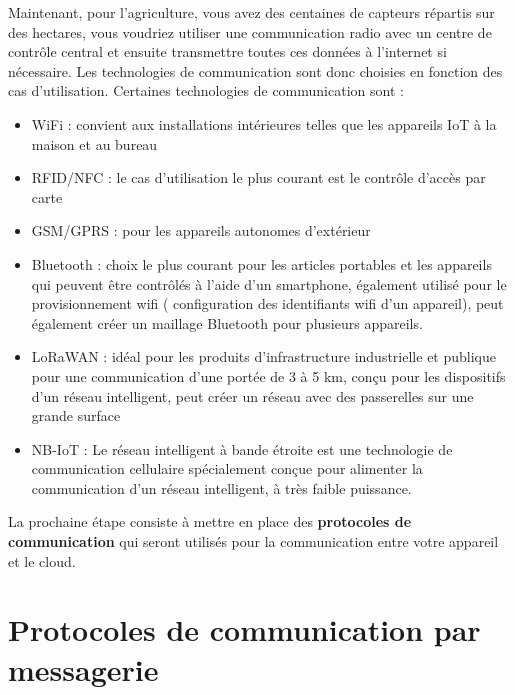 \documentclass[12pt]{report}
\begin{document}
Maintenant, pour l'agriculture, vous avez des centaines de capteurs
répartis sur des hectares, vous voudriez utiliser une communication
radio avec un centre de contrôle central et ensuite transmettre toutes
ces données à l'internet si nécessaire. Les technologies de
communication sont donc choisies en fonction des cas d'utilisation.
Certaines technologies de communication sont :

\begin{itemize}
      \item
            WiFi : convient aux installations intérieures telles que les appareils
            IoT à la maison et au bureau
      \item
            RFID/NFC : le cas d'utilisation le plus courant est le contrôle
            d'accès par carte
      \item
            GSM/GPRS : pour les appareils autonomes d'extérieur
      \item
            Bluetooth : choix le plus courant pour les articles portables et les
            appareils qui peuvent être contrôlés à l'aide d'un smartphone,
            également utilisé pour le provisionnement wifi ( configuration des
            identifiants wifi d'un appareil), peut également créer un maillage
            Bluetooth pour plusieurs appareils.
      \item
            LoRaWAN : idéal pour les produits d'infrastructure industrielle et
            publique pour une communication d'une portée de 3 à 5 km, conçu pour
            les dispositifs d'un réseau intelligent, peut créer un réseau avec des passerelles sur une
            grande surface
      \item
            NB-IoT : Le réseau intelligent à bande étroite est une technologie de communication
            cellulaire spécialement conçue pour alimenter la communication d'un réseau intelligent, à
            très faible puissance.
\end{itemize}

La prochaine étape consiste à mettre en place des \textbf{protocoles de
      communication} qui seront utilisés pour la communication entre votre
appareil et le cloud.

\hypertarget{protocoles-de-communication-par-messagerie}{%
      \section{\texorpdfstring{Protocoles de communication par messagerie
        }{Protocoles de communication par messagerie }}\label{protocoles-de-communication-par-messagerie}}
\end{document}
